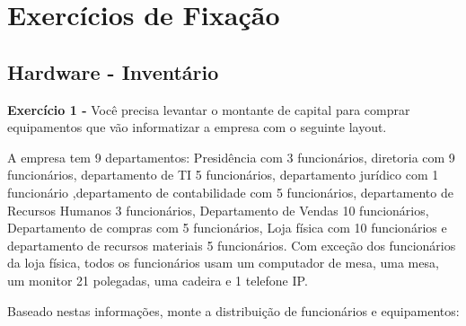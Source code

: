 \documentclass[
]{book}
\begin{document}
\section{Exercícios de Fixação}\label{exercuxedcios-de-fixauxe7uxe3o}

\subsection{Hardware - Inventário}\label{hardware---inventuxe1rio}

\textbf{Exercício 1 -} Você precisa levantar o montante de capital para comprar equipamentos que vão informatizar a empresa com o seguinte layout.

A empresa tem 9 departamentos: Presidência com 3 funcionários, diretoria com 9 funcionários, departamento de TI 5 funcionários, departamento jurídico com 1 funcionário ,departamento de contabilidade com 5 funcionários, departamento de Recursos Humanos 3 funcionários, Departamento de Vendas 10 funcionários, Departamento de compras com 5 funcionários, Loja física com 10 funcionários e departamento de recursos materiais 5 funcionários. Com exceção dos funcionários da loja física, todos os funcionários usam um computador de mesa, uma mesa, um monitor 21 polegadas, uma cadeira e 1 telefone IP.

Baseado nestas informações, monte a distribuição de funcionários e equipamentos:
\end{document}
